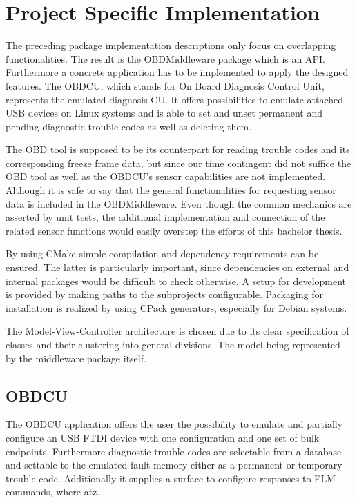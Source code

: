 

\chapter{Project Specific Implementation}

The preceding package implementation descriptions only focus on overlapping functionalities. 
The result is the OBDMiddleware package which is an API.
Furthermore a concrete application has to be implemented to apply the designed features.
The OBDCU, which stands for On Board Diagnosis Control Unit, represents the emulated diagnosis CU.
It offers possibilities to emulate attached USB devices on Linux systems and is able to set and unset
permanent and pending diagnostic trouble codes as well as deleting them.

The OBD tool is supposed to be its counterpart for reading trouble codes and its corresponding freeze frame data,
but since our time contingent did not suffice the OBD tool as well as the OBDCU’s sensor capabilities are not implemented. 
Although it is safe to say that the general functionalities for requesting sensor data is included in the OBDMiddleware. 
Even though the common mechanics are asserted by unit tests,
the additional implementation and connection of the related sensor functions would easily overstep the efforts of this bachelor thesis.

By using CMake simple compilation and dependency requirements can be ensured.
The latter is particularly important, since dependencies on external and internal packages would be difficult to check otherwise.
A setup for development is provided by making paths to the subprojects configurable. 
Packaging for installation is realized by using CPack generators, especially for Debian systems.

The Model-View-Controller architecture is chosen due to its clear specification of classes and their clustering into general divisions. 
The model being represented by the middleware package itself.

\section{OBDCU}

The OBDCU application offers the user the possibility to emulate and partially configure an USB FTDI device with one configuration
and one set of bulk endpoints. Furthermore diagnostic trouble codes are selectable from a database and settable to the emulated 
fault memory either as a permanent or temporary trouble code. 
Additionally it supplies a surface to configure responses to ELM commands, where atz.

